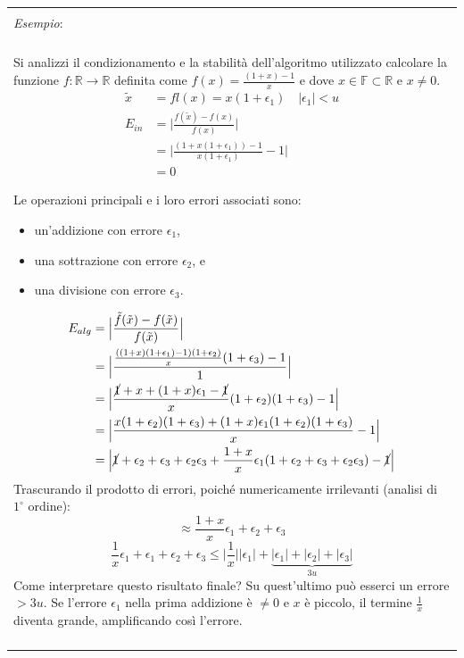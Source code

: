 \documentclass{article}
\newenvironment{example}
{\begin{center}
        \begin{tabular}{|p{0.9\textwidth}|}
            \hline \\ 
            \textit{Esempio}: \\\\ 
        }
        {
            \\\\ \hline
        \end{tabular}
    \end{center}
}
\begin{document}
\begin{example}
   Si analizzi il condizionamento e la stabilità dell'algoritmo utilizzato calcolare la funzione $f:\mathbb{R}\rightarrow
   \mathbb{R}$ definita come $f(x)=\frac{(1+x)-1}{x}$ e dove $x\in
   \mathbb{F}\subset \mathbb{R}\text{ e }x\neq0$.
   \begin{equation*}
        \begin{aligned}
           \tilde{x}&=fl(x)=x(1+\epsilon_1) & \lvert\epsilon_1\rvert < u \\
           E_{in}&=\Big\lvert \frac{f(\tilde{x})-f(x)}{f(x)}\Big\rvert\\ 
                 &=\Big\lvert
                 \frac{(1+x(1+\epsilon_1))-1}{x(1+\epsilon_1)}-1\Big\rvert\\ 
                 &=0
       \end{aligned} 
   \end{equation*}
    
   Le operazioni principali e i loro errori associati sono:
   \begin{itemize}
        \item un'addizione con errore $\epsilon_1$,
        \item una sottrazione con errore $\epsilon_2$, e
        \item una divisione con errore $\epsilon_3$.
   \end{itemize}

   \begin{equation*}
       \begin{aligned}
           E_{alg}&=\Big\lvert\frac{\tilde{f}(\tilde{x})-f(\tilde{x})}{f(\tilde{x})}\Big\rvert\\ 
                  &=\Big\lvert
                  \frac{\frac{((1+x)(1+\epsilon_1)-1)(1+\epsilon_2)}{x}(1+\epsilon_3)-1}{1}\Big\rvert\\ 
                  &=\Big\lvert
                  \frac{\cancel{1}+x+(1+x)\epsilon_1-\cancel{1}}{x}(1+\epsilon_2)(1+\epsilon_3)-1\Big\rvert\\ 
                  &=\Big\lvert
                  \frac{x(1+\epsilon_2)(1+\epsilon_3)+(1+x)\epsilon_1(1+\epsilon_2)(1+\epsilon_3)}{x}-1\Big\rvert\\ 
                  &=\Big\lvert
                  \cancel{1}+\epsilon_2+\epsilon_3+\epsilon_2\epsilon_3+\frac{1+x}{x}\epsilon_1(1+\epsilon_2+\epsilon_3+\epsilon_2\epsilon_3)-\cancel{1}\Big\rvert
       \end{aligned}
   \end{equation*}
   Trascurando il prodotto di errori, poiché numericamente irrilevanti
   (analisi di $1^{\circ}$ ordine):
   $$\approx \frac{1+x}{x}\epsilon_1+\epsilon_2+\epsilon_3$$
   $$\frac{1}{x}\epsilon_1+\epsilon_1+\epsilon_2+\epsilon_3\leq \Big\lvert
   \frac{1}{x}\Big\rvert \lvert \epsilon_1\rvert + \underbrace{\lvert \epsilon_1\rvert +
\lvert \epsilon_2\rvert + \lvert \epsilon_3\rvert}_{3u}$$
    Come interpretare questo risultato finale? Su quest'ultimo può esserci un
    errore $>3u$. Se l'errore $\epsilon_1$ nella prima addizione è $\neq0$ e
    $x$ è piccolo, il termine $\frac{1}{x}$ diventa grande, amplificando così
    l'errore.
\end{example}
\end{document}
